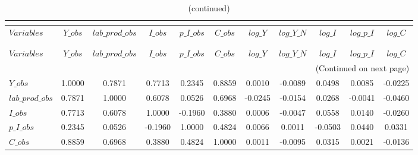  
\begin{center}
\begin{longtable}{lcccccccccc} 
\caption{MATRIX OF CORRELATIONS}\\
 \label{Table:th_corr_matrix}\\
\toprule 
$Variables       $	 & 	 $           Y\_obs$	 & 	 $  lab\_prod\_obs$	 & 	 $           I\_obs$	 & 	 $       p\_I\_obs$	 & 	 $           C\_obs$	 & 	 $           log\_Y$	 & 	 $       log\_Y\_N$	 & 	 $           log\_I$	 & 	 $       log\_p\_I$	 & 	 $           log\_C$\\
\midrule \endfirsthead 
\caption{(continued)}\\
 \toprule \\ 
$Variables       $	 & 	 $           Y\_obs$	 & 	 $  lab\_prod\_obs$	 & 	 $           I\_obs$	 & 	 $       p\_I\_obs$	 & 	 $           C\_obs$	 & 	 $           log\_Y$	 & 	 $       log\_Y\_N$	 & 	 $           log\_I$	 & 	 $       log\_p\_I$	 & 	 $           log\_C$\\
\midrule \endhead 
\midrule \multicolumn{11}{r}{(Continued on next page)} \\ \bottomrule \endfoot 
\bottomrule \endlastfoot 
$Y\_obs          $	 & 	            1.0000	 & 	            0.7871	 & 	            0.7713	 & 	            0.2345	 & 	            0.8859	 & 	            0.0010	 & 	           -0.0089	 & 	            0.0498	 & 	            0.0085	 & 	           -0.0225 \\ 
$lab\_prod\_obs  $	 & 	            0.7871	 & 	            1.0000	 & 	            0.6078	 & 	            0.0526	 & 	            0.6968	 & 	           -0.0245	 & 	           -0.0154	 & 	            0.0268	 & 	           -0.0041	 & 	           -0.0460 \\ 
$I\_obs          $	 & 	            0.7713	 & 	            0.6078	 & 	            1.0000	 & 	           -0.1960	 & 	            0.3880	 & 	            0.0006	 & 	           -0.0047	 & 	            0.0558	 & 	            0.0140	 & 	           -0.0260 \\ 
$p\_I\_obs       $	 & 	            0.2345	 & 	            0.0526	 & 	           -0.1960	 & 	            1.0000	 & 	            0.4824	 & 	            0.0066	 & 	            0.0011	 & 	           -0.0503	 & 	            0.0440	 & 	            0.0331 \\ 
$C\_obs          $	 & 	            0.8859	 & 	            0.6968	 & 	            0.3880	 & 	            0.4824	 & 	            1.0000	 & 	            0.0011	 & 	           -0.0095	 & 	            0.0315	 & 	            0.0021	 & 	           -0.0136 \\ 

\end{longtable}
\end{center}
